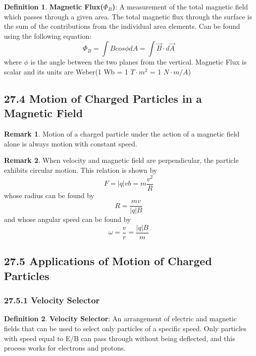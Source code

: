 \documentclass[12pt]{amsart}
\theoremstyle{definition}
\newtheorem{definition}{Definition} %
\newtheorem*{remark}{Remark}        %
\numberwithin{equation}{theorem}    %
\begin{document}
\begin{definition}
    \textbf{Magnetic Flux($\Phi_B$)}:
    A measurement of the total magnetic field which passes through a given area. The total magnetic flux through the surface is the sum of the contributions from the individual area elements. Can be found using the following equation:
    $$\Phi_B = \int B cos\phi dA = \int\vec{B}\cdot d \vec{A}$$
    where $\phi$ is the angle between the two planes from the vertical.
    Magnetic Flux is scalar and its units are Weber(1 Wb = 1 $T\cdot m^2$ = 1 $N\cdot m/A$)

\end{definition}

\subsection*{27.4 Motion of Charged Particles in a Magnetic Field}

\begin{remark}
    Motion of a charged particle under the action of a magnetic field alone is always motion with constant speed.
\end{remark}

\begin{remark}
    When velocity and magnetic field are perpendicular, the particle exhibits circular motion. This relation is shown by $$F = |q|vb = m\frac{v^2}{R}$$ whose radius can be found by $$R = \frac{mv}{|q|B}$$ and whose angular speed can be found by $$\omega = \frac{v}{r} = \frac{|q|B}{m}$$
\end{remark}

\subsection*{27.5 Applications of Motion of Charged Particles}

\subsubsection*{27.5.1 Velocity Selector}

\begin{definition}
    \textbf{Velocity Selector}:
    An arrangement of electric and magnetic fields that can be used to select 
    only particles of a specific speed. Only particles with speed equal to 
    E/B can pass through without being deflected, and this process works for 
    electrons and protons.
\end{definition}
\end{document}
